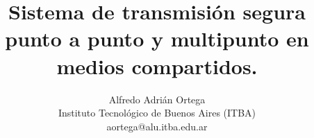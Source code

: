 \documentclass[aspectratio=169]{beamer}
\begin{document}
\title{\textbf{Sistema de transmisión segura punto a punto y multipunto en medios compartidos.}}


\author{\small Alfredo Adrián Ortega\\
Instituto Tecnológico de Buenos Aires (ITBA) \\
     aortega@alu.itba.edu.ar\\    }











\end{document}
